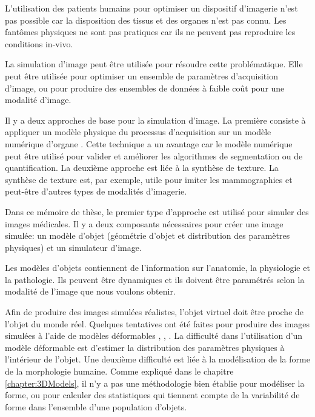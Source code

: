 L'utilisation des patients humains pour optimiser un dispositif d'imagerie n'est pas possible
car la disposition des tissus et des organes n'est pas connu.
Les fantômes physiques ne sont pas pratiques car ils ne peuvent pas reproduire les conditions in-vivo.


La simulation d'image peut être utilisée pour résoudre cette problématique.
Elle peut être utilisée pour optimiser un ensemble de paramètres d'acquisition d'image, 
ou pour produire des ensembles de données à faible coût pour une modalité d'image.

Il y a deux approches de base pour la simulation d'image. La première consiste à
appliquer un modèle physique du processus d'acquisition sur un modèle numérique d'organe \cite{CHAR-09}.
Cette technique a un avantage car le modèle numérique peut être utilisé pour 
valider et améliorer les algorithmes de segmentation ou de quantification.
La deuxième approche est liée à la synthèse de texture. 
La synthèse de texture est, par exemple, utile pour imiter les mammographies \cite{Castella:08} 
et peut-être d'autres types de modalités d'imagerie.

Dans ce mémoire de thèse, le premier type d'approche est utilisé pour simuler des images médicales.
Il y a deux composants nécessaires pour créer une image simulée: 
un modèle d'objet (géométrie d'objet et distribution des paramètres physiques) et un simulateur d'image.

Les modèles d'objets contiennent de l'information sur l'anatomie, la physiologie et la pathologie. 
Ils peuvent être dynamiques et ils doivent être paramétrés selon la modalité de l'image que nous voulons obtenir.

Afin de produire des images simulées réalistes, l'objet virtuel doit être proche de l'objet du monde réel.
Quelques tentatives ont été faites pour produire des images simulées
à l'aide de modèles déformables \cite{segars2008realistic}, \cite{le2009incorporating}, \cite{tobon2011realistic}.
La difficulté dans l'utilisation d'un modèle déformable est d'estimer 
la distribution des paramètres physiques à l'intérieur de l'objet. 
Une deuxième difficulté est liée à la modélisation de la forme de la morphologie humaine.
Comme expliqué dans le chapitre \ref{chapter:3DModels}, 
il n'y a pas une méthodologie bien établie pour modéliser la forme, ou pour calculer des statistiques 
qui tiennent compte de la variabilité de forme dans l'ensemble d'une population d'objets.

